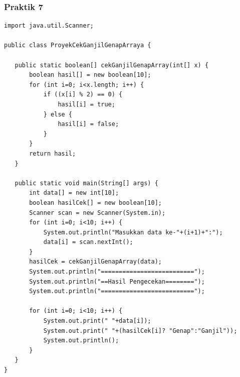 \documentclass[a4paper,12pt]{article}
\begin{document}
\subsubsection{Praktik 7}
\begin{lstlisting}
import java.util.Scanner;

public class ProyekCekGanjilGenapArraya {

   public static boolean[] cekGanjilGenapArray(int[] x) {
       boolean hasil[] = new boolean[10];
       for (int i=0; i<x.length; i++) {
           if ((x[i] % 2) == 0) {
               hasil[i] = true;
           } else {
               hasil[i] = false;
           }
       }
       return hasil;
   }

   public static void main(String[] args) {
       int data[] = new int[10];
       boolean hasilCek[] = new boolean[10];
       Scanner scan = new Scanner(System.in);
       for (int i=0; i<10; i++) {
           System.out.println("Masukkan data ke-"+(i+1)+":");
           data[i] = scan.nextInt();
       }
       hasilCek = cekGanjilGenapArray(data);
       System.out.println("==========================");
       System.out.println("==Hasil Pengecekan========");
       System.out.println("==========================");

       for (int i=0; i<10; i++) {
           System.out.print(" "+data[i]);
           System.out.print(" "+(hasilCek[i]? "Genap":"Ganjil"));
           System.out.println();
       }
   }
}
\end{lstlisting}
\end{document}
